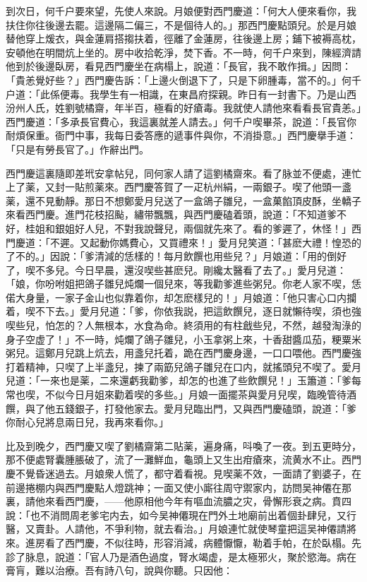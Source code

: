 到次日，何千户要來望，先使人來說。月娘便對西門慶道：「何大人便來看你，我扶住你往後邊去罷。這邊隔二偏三，不是個待人的。」那西門慶點頭兒。於是月娘替他穿上煖衣，與金蓮肩搭搊扶着，徑離了金蓮房，往後邊上房；鋪下被褥高枕，安頓他在明間炕上坐的。房中收拾乾淨，焚下香。不一時，何千户來到，陳經濟請他到於後邊臥房，看見西門慶坐在病榻上，說道：「長官，我不敢作揖。」因問：「貴恙覺好些？」西門慶告訴：「上邊火倒退下了，只是下卵腫毒，當不的。」何千户道：「此係便毒。我學生有一相識，在東昌府探親。昨日有一封書下。乃是山西汾州人氏，姓劉號橘齋，年半百，極看的好瘡毒。我就使人請他來看看長官貴恙。」西門慶道：「多承長官費心，我這裏就差人請去。」何千户喫畢茶，說道：「長官你耐煩保重。衙門中事，我每日委答應的遞事件與你，不消掛意。」西門慶擧手道：「只是有勞長官了。」作辭出門。

西門慶這裏隨即差玳安拿帖兒，同何家人請了這劉橘齋來。看了脉並不便處，連忙上了薬，又封一貼煎薬來。西門慶答賀了一疋杭州絹，一兩銀子。喫了他頭一盞薬，還不見動靜。那日不想鄭愛月兒送了一盒鴿子雛兒，一盒菓餡頂皮酥，坐轎子來看西門慶。進門花枝招颭，繡带飄飄，與西門慶磕着頭，說道：「不知道爹不好，桂姐和銀姐好人兒，不對我說聲兒，兩個就先來了。看的爹遲了，休怪！」西門慶道：「不遲。又起動你媽費心，又買禮來！」愛月兒笑道：「甚麽大禮！惶恐的了不的。」因說：「爹清減的恁樣的！每月飲饌也用些兒？」月娘道：「用的倒好了，喫不多兒。今日早晨，還沒喫些甚麽兒。剛纔太醫看了去了。」愛月兒道：「娘，你吩咐姐把鴿子雛兒炖爛一個兒來，等我勸爹進些粥兒。你老人家不喫，恁偌大身量，一家子金山也似靠着你，却怎麽樣兒的！」月娘道：「他只害心口内攔着，喫不下去。」愛月兒道：「爹，你依我説，把這飲饌兒，逐日就懶待喫，須也強喫些兒，怕怎的？人無根本，水食為命。終須用的有柱戧些兒，不然，越發淘淥的身子空虚了！」不一時，炖爛了鴿子雛兒，小玉拿粥上來，十香甜醬瓜茄，粳粟米粥兒。這鄭月兒跳上炕去，用盞兒托着，跪在西門慶身邊，一口口喂他。西門慶強打着精神，只喫了上半盞兒，揀了兩筯兒鴿子雛兒在口内，就搖頭兒不喫了。愛月兒道：「一來也是薬，二來還虧我勸爹，却怎的也進了些飲饌兒！」玉簫道：「爹每常也喫，不似今日月姐來勸着喫的多些。」月娘一面擺茶與愛月兒喫，臨晚管待酒饌，與了他五錢銀子，打發他家去。愛月兒臨出門，又與西門慶磕頭，說道：「爹你耐心兒將息兩日兒，我再來看你。」

比及到晚夕，西門慶又喫了劉橘齋第二貼薬，遍身痛，呌喚了一夜。到五更時分，那不便處腎囊腫脹破了，流了一灘鮮血，龜頭上又生出疳瘡來，流黄水不止。西門慶不覺昏迷過去。月娘衆人慌了，都守着看視。見喫薬不效，一面請了劉婆子，在前邊捲棚内與西門慶點人燈跳神；一面又使小廝往周守禦家内，訪問吴神僊在那裏，請他來看西門慶，——他原相他今年有嘔血流膿之灾，骨懈形衰之病。賁四說：「也不消問周老爹宅内去，如今吴神僊現在門外土地廟前出着個卦肆兒，又行醫，又賣卦。人請他，不爭利物，就去看治。」月娘連忙就使琴童把這吴神僊請將來。進房看了西門慶，不似往時，形容消減，病體懨懨，勒着手帕，在於臥榻。先診了脉息，說道：「官人乃是酒色過度，腎水竭虚，是太極邪火，聚於慾海。病在膏肓，難以治療。吾有詩八句，說與你聽。只因他：

